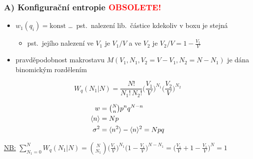 \subsubsection*{A) Konfigurační entropie \quad \textcolor{Red}{\Large OBSOLETE!}}
\begin{itemize}
  \item $w_1(q_i) = \text{konst}$ \dots\ pst.\ nalezení lib.\ částice kdekoliv v boxu je stejná
  \begin{itemize}
    \item[$\Rightarrow$] pst.\ jejího nalezení ve $V_1$ je $V_1/V$ a ve $V_2$ je $V_2/V = 1 - \frac{V_1}{V}$
  \end{itemize}
  \item[$\Rightarrow$] pravděpodobnost makrostavu $M(V_1,N_1,V_2 = V - V_1,N_2 = N - N_1)$ je dána binomickým rozdělením
\end{itemize}

\begin{minipage}{0.62\textwidth}
\[
  W_q(N_1|N) = \frac{N!}{N_1!\,N_2!}\Big(\frac{V_1}{V}\Big)^{N_1}\Big(\frac{V_2}{V}\Big)^{N_2}
\]
\end{minipage}
\begin{minipage}{0.36\textwidth}
\begin{tcolorbox}[colback=white,colframe=NavyBlue,boxrule=0.6pt,arc=0pt,left=2pt,right=2pt]
\color{NavyBlue}
\begin{align*}
  w &= \tbinom{N}{n}p^nq^{N-n} \\
  \langle n\rangle &= Np \\
  \sigma^2 &= \langle n^2\rangle - \langle n\rangle^2 = Npq
\end{align*}
\end{tcolorbox}
\end{minipage}

\textcolor{NavyBlue}{\underline{NB:} $\displaystyle\sum_{N_1=0}^{N}W_q(N_1|N) = \binom{N}{N_1}\Big(\frac{V_1}{V}\Big)^{N_1}\Big(1 - \frac{V_1}{V}\Big)^{N-N_1} = \Big(\frac{V_1}{V} + 1 - \frac{V_1}{V}\Big)^N = 1$}

